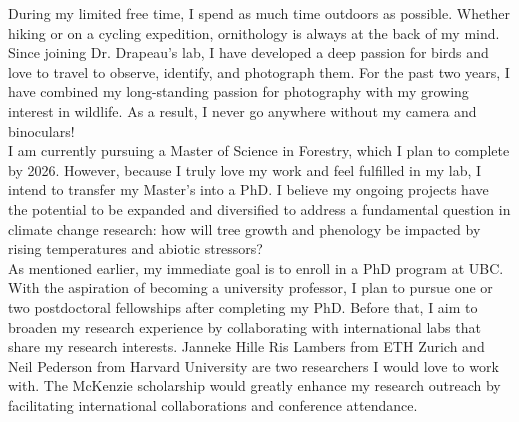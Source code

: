 \documentclass[11pt,letter]{article}
\begin{document}
During my limited free time, I spend as much time outdoors as possible. Whether hiking or on a cycling expedition, ornithology is always at the back of my mind. Since joining Dr. Drapeau's lab, I have developed a deep passion for birds and love to travel to observe, identify, and photograph them. For the past two years, I have combined my long-standing passion for photography with my growing interest in wildlife. As a result, I never go anywhere without my camera and binoculars! \\

I am currently pursuing a Master of Science in Forestry, which I plan to complete by 2026. However, because I truly love my work and feel fulfilled in my lab, I intend to transfer my Master’s into a PhD. I believe my ongoing projects have the potential to be expanded and diversified to address a fundamental question in climate change research: how will tree growth and phenology be impacted by rising temperatures and abiotic stressors? \\

As mentioned earlier, my immediate goal is to enroll in a PhD program at UBC. With the aspiration of becoming a university professor, I plan to pursue one or two postdoctoral fellowships after completing my PhD. Before that, I aim to broaden my research experience by collaborating with international labs that share my research interests. Janneke Hille Ris Lambers from ETH Zurich and Neil Pederson from Harvard University are two researchers I would love to work with. The McKenzie scholarship would greatly enhance my research outreach by facilitating international collaborations and conference attendance.


\end{document}
